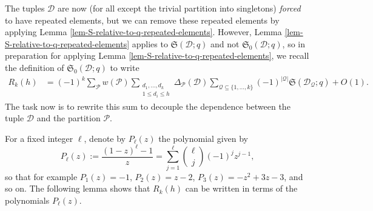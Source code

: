 \documentclass[11pt,letterpaper]{amsart}
\theoremstyle{definition}
\begin{document}
The tuples $\mathcal D$ are now (for all except the trivial partition into singletons) \emph{forced} to have repeated elements, but we can remove these repeated elements by applying Lemma \ref{lem-S-relative-to-q-repeated-elements}. However, Lemma \ref{lem-S-relative-to-q-repeated-elements} applies to $\mathfrak S(\mathcal D;q)$ and not $\mathfrak S_0(\mathcal D;q)$, so in preparation for applying Lemma \ref{lem-S-relative-to-q-repeated-elements}, we recall the definition of $\mathfrak{S}_0(\mathcal{D};q)$ to write
\begin{align*}
R_k(h) &=  (-1)^{k}\sum_{\mathcal P} w(\mathcal P) \sum_{\substack{d_1, \dots, d_k \\ 1 \le d_i \le h }}\Delta_{\mathcal{P}}(\mathcal{D})  \sum_{\mathcal Q \subseteq \{1,\ldots,k\}} (-1)^{|\mathcal Q|} \mathfrak S(\mathcal{D}_{\mathcal{Q}};q) + O(1).
\end{align*}
The task now is to rewrite this sum to decouple the dependence between the tuple $\mathcal{D}$ and the partition $\mathcal{P}$. 

For a fixed integer $\ell$, denote by $P_\ell(z)$ the polynomial given by
\begin{equation}\label{eq:Pkz-polynomial-definition}
P_\ell(z) := \frac{(1-z)^\ell-1}{z} = \sum_{j=1}^\ell \binom{\ell}{j} (-1)^{j} z^{j-1},
\end{equation}
so that for example $P_1(z) = -1$, $P_2(z) = z-2$, $P_3(z) = -z^2+3z-3$, and so on. The following lemma shows that $R_k(h)$ can be written in terms of the polynomials $P_\ell(z)$.
\end{document}
